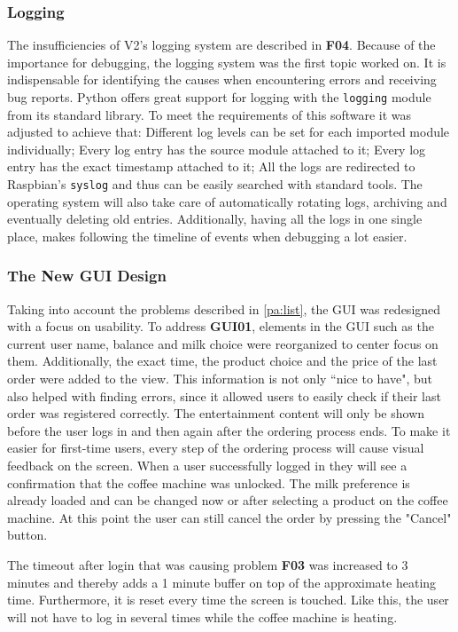 \documentclass[12pt]{article}
\begin{document}
\subsubsection{Logging}
The insufficiencies of V2's logging system are described in \textbf{F04}.
Because of the importance for debugging, the logging system was the first topic worked on.
It is indispensable for identifying the causes when encountering errors and receiving bug reports.
Python offers great support for logging with the \texttt{logging} module from its standard library. 
To meet the requirements of this software it was adjusted to achieve that:
Different log levels can be set for each imported module individually;
Every log entry has the source module attached to it;
Every log entry has the exact timestamp attached to it;
All the logs are redirected to Raspbian's \texttt{syslog} and thus can be easily searched with standard tools.
The operating system will also take care of automatically rotating logs, archiving and eventually deleting old entries.
Additionally, having all the logs in one single place, makes following the timeline of events when debugging a lot easier.

\subsubsection{The New GUI Design}
Taking into account the problems described in \ref{pa:list},
the GUI was redesigned with a focus on usability.
To address \textbf{GUI01}, elements in the GUI such as the current user name,
balance and milk choice were reorganized to center focus on them.
Additionally, the exact time, the product choice and the price of the last order were added to the view.
This information is not only ``nice to have", but also helped with finding errors,
since it allowed users to easily check if their last order was registered correctly.
The entertainment content will only be shown before the user logs in and then again after the ordering process ends.
To make it easier for first-time users, every step of the ordering process will cause visual feedback on the screen.
When a user successfully logged in they will see a confirmation that the coffee machine was unlocked.
The milk preference is already loaded and can be changed now or after selecting a product on the coffee machine.
At this point the user can still cancel the order by pressing the "Cancel" button.

The timeout after login that was causing problem \textbf{F03} was increased to 3 minutes and thereby adds a 1 minute buffer on top of the approximate heating time.
Furthermore, it is reset every time the screen is touched. Like this, the user will not have to log in several times while the coffee machine is heating. 
\end{document}
